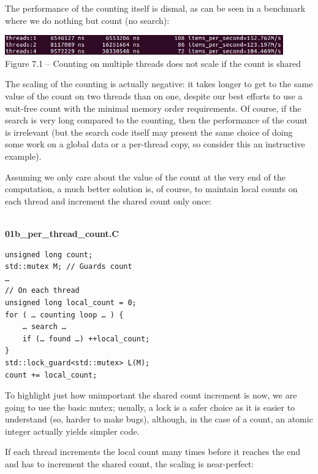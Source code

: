 The performance of the counting itself is dismal, as can be seen in a benchmark where we do nothing but count (no search):

\begin{center}
\includegraphics[width=0.9\textwidth]{content/2/chapter7/images/1.jpg}\\
Figure 7.1 – Counting on multiple threads does not scale if the count is shared
\end{center}

The scaling of the counting is actually negative: it takes longer to get to the same value of the count on two threads than on one, despite our best efforts to use a wait-free count with the minimal memory order requirements. Of course, if the search is very long compared to the counting, then the performance of the count is irrelevant (but the search code itself may present the same choice of doing some work on a global data or a per-thread copy, so consider this an instructive example).

Assuming we only care about the value of the count at the very end of the computation, a much better solution is, of course, to maintain local counts on each thread and increment the shared count only once:

\hspace*{\fill} \\ %
\noindent
\textbf{01b\_per\_thread\_count.C}
\begin{lstlisting}[style=styleCXX]
unsigned long count;
std::mutex M; // Guards count
…
// On each thread
unsigned long local_count = 0;
for ( … counting loop … ) {
	… search …
	if (… found …) ++local_count;
}
std::lock_guard<std::mutex> L(M);
count += local_count;
\end{lstlisting}

To highlight just how unimportant the shared count increment is now, we are going to use the basic mutex; usually, a lock is a safer choice as it is easier to understand (so, harder to make bugs), although, in the case of a count, an atomic integer actually yields simpler code.

If each thread increments the local count many times before it reaches the end and has to increment the shared count, the scaling is near-perfect:


